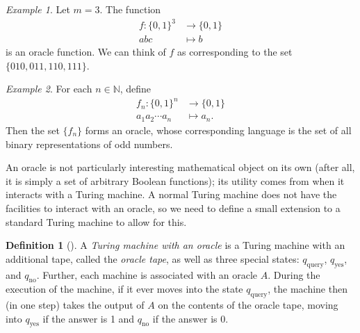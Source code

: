 \documentclass[english,12pt]{reedthesis}
\theoremstyle{plain}
\theoremstyle{definition}
\newtheorem{defn}[defn]{Definition}
\theoremstyle{remark}
\newtheorem{example}{Example}[thm]
\begin{document}
\begin{example}\label{ex:oracle-function}
  Let $m = 3$. The function
  \begin{equation}
    \begin{aligned}
      f\colon \{0, 1\}^{3} &\rightarrow \{0, 1\} \\
      abc &\mapsto b
    \end{aligned}
  \end{equation}
  is an oracle function. We can think of $f$ as corresponding to the set
  $\{010, 011, 110, 111\}$.
\end{example}

\begin{example}\label{ex:oracle-full}
  For each $n \in \mathbb{N}$, define
  \begin{equation}
    \begin{aligned}
      f_{n}\colon \{0, 1\}^{n} &\rightarrow \{0, 1\} \\
      a_{1}a_{2} \cdots a_{n} &\mapsto a_{n}.
    \end{aligned}
  \end{equation}
  Then the set $\{f_{n}\}$ forms an oracle, whose corresponding language is the
  set of all binary representations of odd numbers.
\end{example}


An oracle is not particularly interesting mathematical object on its own (after
all, it is simply a set of arbitrary Boolean functions); its utility comes from
when it interacts with a Turing machine. A normal Turing machine does not have
the facilities to interact with an oracle, so we need to define a small
extension to a standard Turing machine to allow for this.

\begin{defn}[{\cite[Def.\ 3.6]{AB09}}]\label{def:tm-oracle}
  A \emph{Turing machine with an oracle} is a Turing machine with an additional
  tape, called the \emph{oracle tape}, as well as three special states:
  $q_{\text{query}}$, $q_{\text{yes}}$, and $q_{\text{no}}$. Further, each
  machine is associated with an oracle $A$. During the execution of the machine,
  if it ever moves into the state $q_{\text{query}}$, the machine then (in one
  step) takes the output of $A$ on the contents of the oracle tape, moving into
  $q_{\text{yes}}$ if the answer is 1 and $q_{\text{no}}$ if the answer is 0.
\end{defn}
\end{document}
